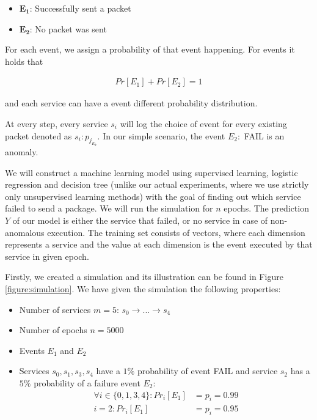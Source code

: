 \begin{itemize}
    \item $\mathbf{E_1}$: Successfully sent a packet
    \item $\mathbf{E_2}$: No packet was sent
\end{itemize}

For each event, we assign a probability of that event happening. For events it holds that 

\begin{gather*}
    Pr[E_1] + Pr[E_2] = 1
\end{gather*}

and each service can have a event different probability distribution.

At every step, every service $s_i$ will log the choice of event for every existing packet denoted as $s_i: p_{j_{E_k}}$. In our simple scenario, the event $E_2:$ FAIL is an anomaly. 

We will construct a machine learning model using supervised learning, logistic regression and decision tree (unlike our actual experiments, where we use strictly only unsupervised learning methods) with the goal of finding out which service failed to send a package. We will run the simulation for $n$ epochs. The prediction $Y$ of our model is either the service that failed, or no service in case of non-anomalous execution. The training set consists of vectors, where each dimension represents a service and the value at each dimension is the event executed by that service in given epoch. 

Firstly, we created a simulation and its illustration can be found in Figure \ref{figure:simulation}. We have given the simulation the following properties: 

\begin{itemize}
    \item Number of services $m = 5$: $s_0 \rightarrow ... \rightarrow s_{4}$
    \item Number of epochs $n = 5000$
    \item Events $E_1$ and $E_2$
    \item Services $s_0, s_1, s_3, s_4$ have a $1\%$ probability of event FAIL and service $s_2$ has a $5\%$ probability of a failure event $E_2$:
    \begin{align*}
        \forall i \in \{0, 1, 3, 4\}: Pr_i[E_1] &= p_i = 0.99 \\
        i = 2: Pr_i[E_1] &= p_i = 0.95
    \end{align*}
\end{itemize}

